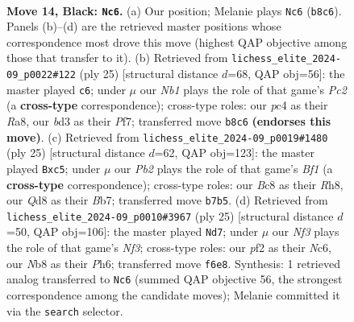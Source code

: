 \documentclass[11pt]{article}
\begin{document}
\clearpage

\begin{figure}[p]\centering
\begin{subfigure}{0.46\textwidth}\centering
\resizebox{\linewidth}{!}{%
\newchessgame
\chessboard[
  setfen={rnbq1rk1/pp3ppp/4pn2/2P5/2P5/3BP3/P1N2PPP/1RBQ1RK1 b - - 6 14},
  showmover=false,
  pgfstyle=straightmove, color=movearrow, markmove={b8-c6}
]}
\caption{}
\end{subfigure}\hfill
\begin{subfigure}{0.46\textwidth}\centering
\resizebox{\linewidth}{!}{%
\newchessgame
\chessboard[
  setfen={r1bq1rk1/1pp2ppp/p4n2/b7/P1B5/2N1P3/1P1B1PPP/R2Q1RK1 b - - 3 13},
  showmover=false,
  pgfstyle=straightmove, color=movearrow, markmove={c7-c6}
]}
\caption{}
\end{subfigure}
\\[4pt]
\begin{subfigure}{0.46\textwidth}\centering
\resizebox{\linewidth}{!}{%
\newchessgame
\chessboard[
  setfen={r2qkb1r/1b3ppp/p3pn2/2P5/Pp6/3BPN2/1P3PPP/R1BQ1RK1 b kq - 0 13},
  showmover=false,
  pgfstyle=straightmove, color=movearrow, markmove={f8-c5}
]}
\caption{}
\end{subfigure}\hfill
\begin{subfigure}{0.46\textwidth}\centering
\resizebox{\linewidth}{!}{%
\newchessgame
\chessboard[
  setfen={r1bq1rk1/1p3pp1/p1n1pn1p/2P5/8/P1PBPN1P/5PP1/R1BQ1RK1 b - - 0 13},
  showmover=false,
  pgfstyle=straightmove, color=movearrow, markmove={f6-d7}
]}
\caption{}
\end{subfigure}
\caption{\textbf{Move 14, Black: \texttt{Nc6}.} (a) Our position; Melanie plays \texttt{Nc6} (\texttt{b8c6}). Panels (b)--(d) are the retrieved master positions whose correspondence most drove this move (highest QAP objective among those that transfer to it). (b) Retrieved from \texttt{lichess\_elite\_2024-09\_p0022\#122} (ply 25) [structural distance $d$=68, QAP obj=56]: the master played \texttt{c6}; under $\mu$ our \emph{Nb1} plays the role of that game's \emph{Pc2} (a \textbf{cross-type} correspondence); cross-type roles: our \emph{p}c4 as their \emph{R}a8, our \emph{b}d3 as their \emph{P}f7; transferred move \texttt{b8c6} \textbf{(endorses this move)}. (c) Retrieved from \texttt{lichess\_elite\_2024-09\_p0019\#1480} (ply 25) [structural distance $d$=62, QAP obj=123]: the master played \texttt{Bxc5}; under $\mu$ our \emph{Pb2} plays the role of that game's \emph{Bf1} (a \textbf{cross-type} correspondence); cross-type roles: our \emph{B}c8 as their \emph{R}h8, our \emph{Q}d8 as their \emph{B}b7; transferred move \texttt{b7b5}. (d) Retrieved from \texttt{lichess\_elite\_2024-09\_p0010\#3967} (ply 25) [structural distance $d$=50, QAP obj=106]: the master played \texttt{Nd7}; under $\mu$ our \emph{Nf3} plays the role of that game's \emph{Nf3}; cross-type roles: our \emph{p}f2 as their \emph{N}c6, our \emph{N}b8 as their \emph{P}h6; transferred move \texttt{f6e8}. Synthesis: 1 retrieved analog transferred to \texttt{Nc6} (summed QAP objective 56, the strongest correspondence among the candidate moves); Melanie committed it via the \texttt{search} selector.}
\label{fig:thought-m27}
\end{figure}
\end{document}
